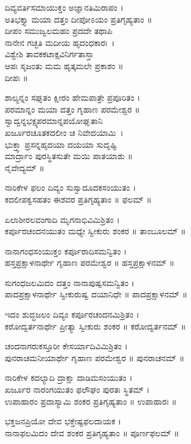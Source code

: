 ದಿವ್ಯವರ್ತಿಸಮಾಯುಕ್ತಂ ಅಜ್ಞಾನತಿಮಿರಾಪಂ ।\\
ಅತಿಭಕ್ತ್ಯಾ ಮಯಾ ದತ್ತಂ ದೀಪೋಽಯಂ ಪ್ರತಿಗೃಹ್ಯತಾಂ ॥\\
ದೀಪಂ ಸಮುಜ್ವಲಮಹಂ ಪ್ರದದೇ ತಥಾಪಿ\\ ನಾನೇನ ಗಚ್ಛತಿ ಮದೀಯ ಹೃದಂಧಕಾರಃ~।\\
ವಿಶ್ವೇಶಿ ತಾವಕಕಟಾಕ್ಷವಿನಿರ್ಗತಾಸ್ತಾ \\ಆಪಃ ಸೃಜಂತು ಮಮ ಹೃತ್ಕಮಲೇ ಪ್ರಕಾಶಂ ॥\\
ದೀಪಃ ॥

ಶಾಲ್ಯನ್ನಂ ಸಘೃತಂ ಕ್ಷೀರಂ ಹೇಮಪಾತ್ರೇ ಪ್ರಪೂರಿತಂ ।\\
ಪರಮಾನ್ನಂ ಮಯಾ ದತ್ತಂ ಗೃಹಾಣ ಪರಮೇಶ್ವರ ॥\\
ಸ್ವಾದ್ವನ್ನಭಕ್ಷ್ಯಪರಮಾನ್ನಪಯೋಘೃತಾನಿ \\ಖರ್ಜೂರಚೂತಕದಲೀಂ ಚ ನಿವೇದಯಾಮಿ~।\\
ಭುಕ್ತ್ವಾ ಪ್ರಸನ್ನಹೃದಯಾ ದಯಯಾ ಸುದೃಷ್ಟಿ\-\\ಮಾರ್ದ್ರಾಂ ಪುರಸ್ಥಿತಸುತೇ ಮಯಿ ಪಾತಯಾಶು ॥\\
 ನೈವೇದ್ಯಮ್ ॥

ನಾರಿಕೇಳ ಫಲಂ ದಿವ್ಯಂ ಸುಸ್ವಾದೂದಕಸಂಯುತಂ ।\\
ಕದಲೀಪಕ್ವಸಹತಂ ಈಶವರ ಪ್ರತಿಗೃಹ್ಯತಾಂ ॥ ಫಲಮ್ ॥

ಏಲಾಶೀರಲವಂಗಾದಿ ಮೃಗನಾಭಿವಿಮಿಶ್ರಿತಂ ।\\
ಕರ್ಪೂರಚಂದನಯುತಂ ಮಧ್ಯೇ ಸ್ವೀಕುರು ಶಂಕರ ॥ ತಾಂಬೂಲಮ್ ॥

ನಾನಾಗಂಧಸಂಯುಕ್ತಂ ಕರ್ಪೂರಾದಿಸಮನ್ವಿತಂ ।\\
ಹಸ್ತಪ್ರಕ್ಷಾಳನಾರ್ಥೇ ಗೃಹಾಣ ಪರಮೇಶ್ವರ    ॥ ಹಸ್ತಪ್ರಕ್ಷಾಳನಮ್ ॥

ಸುಗಂಧಜಲಮಿದಂ ದತ್ತಂ ನಾನಾಪುಷ್ಪಸಮನ್ವಿತಂ ।\\
ಪಾದಪ್ರಕ್ಷಾಳನಾರ್ಥೇ ಸ್ವೀಕುರುಷ್ವ ದಯಾನಿಧೇ  ॥ ಪಾದಪ್ರಕ್ಷಾಳನಮ್ ॥

ಇದಂ ಶುದ್ಧಜಲಂ ದಿವ್ಯಂ ಕರ್ಪೂರಚಂದನಮಿಶ್ರಿತಂ ।\\
ಕರೋದ್ವರ್ತನಾರ್ಥೇ ಪ್ರೀತ್ಯಾ ಸ್ವೀಕುರು ಶಂಕರ ॥ ಕರೋದ್ವರ್ತನಮ್ ॥

ಚಂದನಾಗರುಕಸ್ತೂರೀ ಕೇಸರ್ಯಾದಿವಿಮಿಶ್ರಿತಂ ।\\
ಪುನರಾಚಮನೀಯಾರ್ಥೇ ಗೃಹಾಣ ಪರಮೇಶ್ವರ ॥ ಪುನರಾಚನಮ್ ॥

ನಾರಿಕೇಳ ಕದಲ್ಯಾದಿ ದ್ರಾಕ್ಷಾ ದಾಡಿಮಸಂಯುತಂ ।\\
ಖರ್ಜೂರ ನಾರಂಗಯುತಂ ಫಲೌಘಂ ಪುರತಃ ಸ್ಥಿತಮ್ ।\\ 
ಉಪಾಹಾರಂ ಪ್ರದಾಸ್ಯಾಮಿ  ಶಂಕರ ಪ್ರತಿಗೃಹ್ಯತಾಂ ॥ ಉಪಾಹಾರಃ ॥

ಭಕ್ತಜನಪ್ರಿಯೋ ದೇವ ಭಕ್ತೇಷ್ಟಫಲದಾಯಕ ।\\
ನಾನಾಫಲಮಿದಂ ದೇವ ಶಂಕರ ಪ್ರತಿಗೃಹ್ಯತಾಂ ॥ ಪೂರ್ಣಫಲಮ್ ॥

